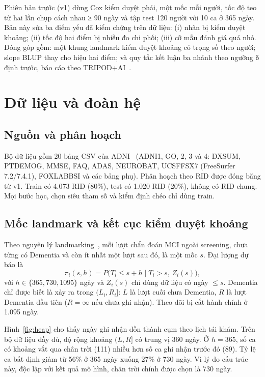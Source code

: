 \documentclass[conference]{IEEEtran}
\begin{document}
Phiên bản trước (v1) dùng Cox kiểm duyệt phải, một mốc mỗi người, tốc độ teo từ hai lần chụp cách nhau ≥ 90 ngày và tập test 120 người với 10 ca ở 365 ngày. Bản này sửa ba điểm yếu đã kiểm chứng trên dữ liệu: (i) nhãn bị kiểm duyệt khoảng; (ii) tốc độ hai điểm bị nhiễu đo chi phối; (iii) cỡ mẫu đánh giá quá nhỏ. Đóng góp gồm: một khung landmark kiểm duyệt khoảng có trọng số theo người; slope BLUP thay cho hiệu hai điểm; và quy tắc kết luận ba nhánh theo ngưỡng δ định trước, báo cáo theo TRIPOD+AI~\cite{tripod}.

\section{Dữ liệu và đoàn hệ}
\subsection{Nguồn và phân hoạch}
Bộ dữ liệu gồm 20 bảng CSV của ADNI~\cite{adni} (ADNI1, GO, 2, 3 và 4: DXSUM, PTDEMOG, MMSE, FAQ, ADAS, NEUROBAT, UCSFFSX7 (FreeSurfer 7.2/7.4.1), FOXLABBSI và các bảng phụ). Phân hoạch theo RID được đóng băng từ v1. Train có 4.073 RID (80\%), test có 1.020 RID (20\%), không có RID chung. Mọi bước học, chọn siêu tham số và kiểm định chéo chỉ dùng train.

\subsection{Mốc landmark và kết cục kiểm duyệt khoảng}
Theo nguyên lý landmarking~\cite{landmark}, mỗi lượt chẩn đoán MCI ngoài screening, chưa từng có Dementia và còn ít nhất một lượt sau đó, là một mốc $s$. Đại lượng dự báo là
\begin{equation}
\pi_i(s,h)=P\big(T_i\le s+h \mid T_i>s,\,Z_i(s)\big),
\end{equation}
với $h\in\{365,730,1095\}$ ngày và $Z_i(s)$ chỉ dùng dữ liệu có ngày $\le s$. Dementia chỉ được biết là xảy ra trong $(L_i,R_i]$: $L$ là lượt cuối chưa Dementia, $R$ là lượt Dementia đầu tiên ($R=\infty$ nếu chưa ghi nhận). Theo dõi bị cắt hành chính ở 1.095 ngày.

Hình~\ref{fig:heap} cho thấy ngày ghi nhận dồn thành cụm theo lịch tái khám. Trên bộ dữ liệu đầy đủ, độ rộng khoảng $(L,R]$ có trung vị 360 ngày. Ở $h=365$, số ca có khoảng vắt qua chân trời (111) nhiều hơn số ca ghi nhận trước đó (89). Tỷ lệ ca bất định giảm từ 56\% ở 365 ngày xuống 27\% ở 730 ngày. Vì lý do cấu trúc này, độc lập với kết quả mô hình, chân trời chính được chọn là 730 ngày.
\end{document}
